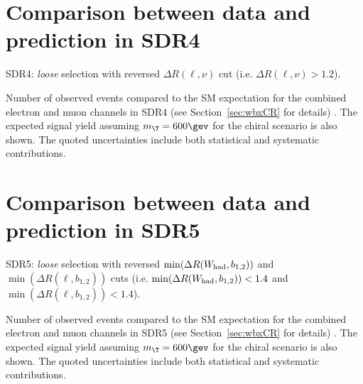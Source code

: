 \clearpage

%


\clearpage

\section{Comparison between data and prediction in SDR4}
\label{sec:DataMC_CR3}

SDR4: {\sl loose} selection with reversed $\Delta R(\ell,\nu)$ cut (i.e. $\Delta R(\ell,\nu)>1.2$).

\begin{table}[h!]
\begin{center}

\caption{\small{Number of observed events compared to the SM expectation for
the combined electron and muon channels in SDR4 (see Section~\ref{sec:wbxCR} for details) . 
The expected signal yield assuming $m_{\T}=600\gev$ for the chiral scenario is also shown. 
The quoted uncertainties include both statistical and systematic contributions.}}
\label{tab:CR3_1W_evtable}
\end{center}
\end{table}

\clearpage

%


\clearpage

\section{Comparison between data and prediction in SDR5}
\label{sec:DataMC_CR4}

SDR5: {\sl loose} selection with reversed $\min(\Delta R(W_{\rm had}, b_{1,2}))$ and $\min(\Delta R(\ell, b_{1,2}))$ cuts 
(i.e. $\min(\Delta R(W_{\rm had}, b_{1,2}))<1.4$ and $\min(\Delta R(\ell, b_{1,2}))<1.4$).

\begin{table}[h!]
\begin{center}

\caption{\small{Number of observed events compared to the SM expectation for
the combined electron and muon channels in SDR5 (see Section~\ref{sec:wbxCR} for details) . 
The expected signal yield assuming $m_{\T}=600\gev$ for the chiral scenario is also shown. 
The quoted uncertainties include both statistical and systematic contributions.}}
\label{tab:CR4_1W_evtable}
\end{center}
\end{table}

